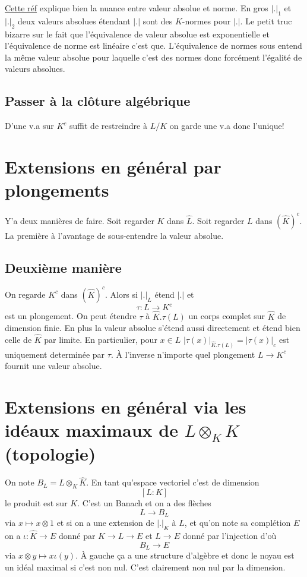 \documentclass[a4paper,12pt]{book}
\theoremstyle{plain}
\theoremstyle{definition}
\theoremstyle{remark}
\begin{document}
\href{https://math.stackexchange.com/questions/4096251/
equivalence-of-norms-on-valued-fields}{Cette réf} 
explique bien la nuance entre valeur absolue et norme. En gros
$|.|_1$ et $|.|_2$ deux valeurs absolues étendant $|.|$ sont
des $K$-normes pour $|.|$. Le petit truc bizarre sur le fait
que l'équivalence de valeur absolue est exponentielle et 
l'équivalence de norme est linéaire c'est que. L'équivalence de
normes sous entend la même valeur absolue pour laquelle c'est des
normes donc forcément l'égalité de valeurs absolues.

\subsection{Passer à la clôture algébrique}
D'une v.a sur $K^c$ suffit de restreindre à $L/K$
on garde une v.a donc l'unique!

\section{Extensions en général par plongements}

Y'a deux manières de faire. Soit regarder
$K$ dans $\hat L$. Soit regarder $L$ dans
$(\hat K)^c$. La première à l'avantage de 
sous-entendre la valeur absolue.
\subsection{Deuxième manière}
On regarde $K^c$ dans $(\hat K)^c$.
Alors si $|.|_L$ étend $|.|$ et
\[\tau \colon L\to K^c\] est un plongement.
On peut étendre $\tau$ à $\hat K.\tau(L)$ un
corps complet sur $\hat K$ de dimension finie.
En plus la valeur absolue s'étend aussi 
directement et étend bien celle de $\hat K$
par limite. En particulier, pour $x\in L$
$|\tau(x)|_{\hat K.\tau(L)}=|\tau(x)|_c$ est
uniquement determinée par $\tau$. À l'inverse
n'importe quel plongement $L\to K^c$ fournit
une valeur absolue.

\section{Extensions en général via les idéaux
maximaux de $L\otimes_K\hat K$ (topologie)}
On note $B_L=L\otimes_K \hat K$. En tant qu'espace
vectoriel c'est de dimension 
\[[L:K]\]
le produit est sur $K$. C'est un Banach et on a 
des flèches
\[L\to B_L\]
via $x\mapsto x\otimes 1$ et si on a une extension de $|.|_K$ à
$L$, et qu'on note sa complétion $E$ on a
$\iota \colon\hat K\to E$ donné par $K\to L\to E$ et
$L\to E$ donné par l'injection d'où 
\[B_L\to E\]
via $x\otimes y\mapsto x\iota(y)$. À gauche ça a une structure
d'algèbre et donc le noyau est un idéal maximal si c'est
non nul. C'est clairement non nul par la dimension.
\end{document}
